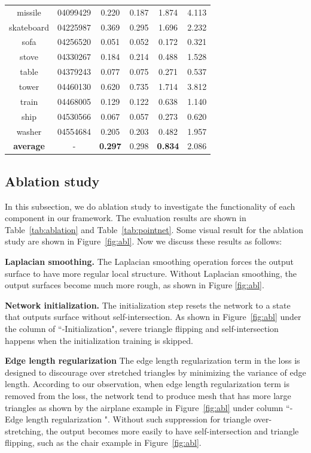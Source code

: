 \begin{table}
\begin{tabular}{c c c c c c}
		missile & 04099429 & 0.220 & 0.187 & 1.874 & 4.113 \\
		skateboard & 04225987 & 0.369 & 0.295 & 1.696 & 2.232 \\
		sofa & 04256520 & 0.051 & 0.052 & 0.172 & 0.321 \\
		stove & 04330267 & 0.184 & 0.214 & 0.488 & 1.528 \\
		table & 04379243 & 0.077 & 0.075 & 0.271 & 0.537 \\
		tower & 04460130 & 0.620 & 0.735 & 1.714 & 3.812 \\
		train & 04468005 & 0.129 & 0.122 & 0.638 & 1.140 \\
		ship  & 04530566 & 0.067 & 0.057 & 0.273 & 0.620 \\
		washer &  04554684 & 0.205 & 0.203 & 0.482 & 1.957 \\
		\hline
		\textbf{average}   &     -     & \textbf{0.297} & 0.298 & \textbf{0.834} & 2.086\\
		\hline
	\end{tabular}
\end{table}



\subsection{Ablation study}
In this subsection, we do ablation study to investigate the functionality of each component in our framework. The evaluation results are shown in Table~\ref{tab:ablation} and Table~\ref{tab:pointnet}. Some visual result for the ablation study are shown in Figure~\ref{fig:abl}. Now we discuss these results as follows:

\noindent\textbf{Laplacian smoothing.}
The Laplacian smoothing operation forces the output surface to have more regular local structure. 
Without Laplacian smoothing, the output surfaces become much more rough, as shown in Figure \ref{fig:abl}.


\noindent\textbf{Network initialization.}
The initialization step resets the network to a state that outputs surface without self-intersection. 
As shown in Figure~\ref{fig:abl} under the column of ``-Initialization", severe triangle flipping and self-intersection happens when the initialization training is skipped.

\noindent\textbf{Edge length regularization}
The edge length regularization term in the loss is designed to discourage over stretched triangles by minimizing the variance of edge length. According to our observation, when edge length regularization term is removed from the loss, the network tend to produce mesh that has more large triangles as shown by the airplane example in Figure~\ref{fig:abl} under column ``-Edge length regularization ". 
Without such suppression for triangle over-stretching, the output becomes more easily to have self-intersection and triangle flipping, such as the chair example in Figure~\ref{fig:abl}.

